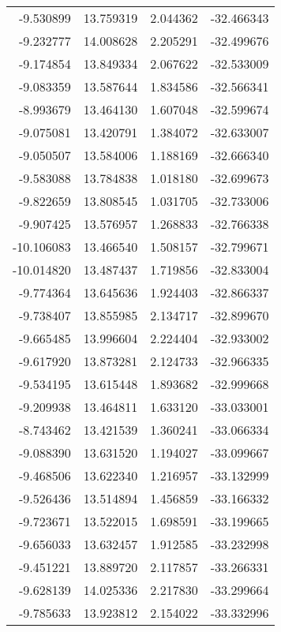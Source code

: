 \begin{tabular}{rrrr}
       -9.530899 &        13.759319 &    2.044362 & -32.466343 \\
       -9.232777 &        14.008628 &    2.205291 & -32.499676 \\
       -9.174854 &        13.849334 &    2.067622 & -32.533009 \\
       -9.083359 &        13.587644 &    1.834586 & -32.566341 \\
       -8.993679 &        13.464130 &    1.607048 & -32.599674 \\
       -9.075081 &        13.420791 &    1.384072 & -32.633007 \\
       -9.050507 &        13.584006 &    1.188169 & -32.666340 \\
       -9.583088 &        13.784838 &    1.018180 & -32.699673 \\
       -9.822659 &        13.808545 &    1.031705 & -32.733006 \\
       -9.907425 &        13.576957 &    1.268833 & -32.766338 \\
      -10.106083 &        13.466540 &    1.508157 & -32.799671 \\
      -10.014820 &        13.487437 &    1.719856 & -32.833004 \\
       -9.774364 &        13.645636 &    1.924403 & -32.866337 \\
       -9.738407 &        13.855985 &    2.134717 & -32.899670 \\
       -9.665485 &        13.996604 &    2.224404 & -32.933002 \\
       -9.617920 &        13.873281 &    2.124733 & -32.966335 \\
       -9.534195 &        13.615448 &    1.893682 & -32.999668 \\
       -9.209938 &        13.464811 &    1.633120 & -33.033001 \\
       -8.743462 &        13.421539 &    1.360241 & -33.066334 \\
       -9.088390 &        13.631520 &    1.194027 & -33.099667 \\
       -9.468506 &        13.622340 &    1.216957 & -33.132999 \\
       -9.526436 &        13.514894 &    1.456859 & -33.166332 \\
       -9.723671 &        13.522015 &    1.698591 & -33.199665 \\
       -9.656033 &        13.632457 &    1.912585 & -33.232998 \\
       -9.451221 &        13.889720 &    2.117857 & -33.266331 \\
       -9.628139 &        14.025336 &    2.217830 & -33.299664 \\
       -9.785633 &        13.923812 &    2.154022 & -33.332996 \\
\bottomrule
\end{tabular}
